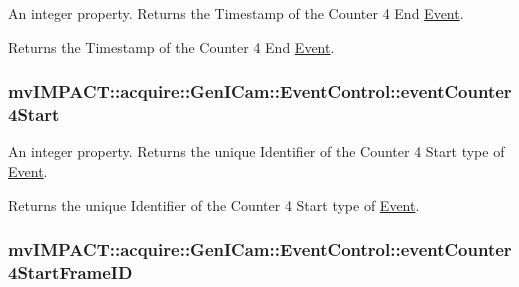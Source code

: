 An integer property. Returns the Timestamp of the Counter 4 End \hyperlink{classmv_i_m_p_a_c_t_1_1acquire_1_1_event}{Event}. 

Returns the Timestamp of the Counter 4 End \hyperlink{classmv_i_m_p_a_c_t_1_1acquire_1_1_event}{Event}. \hypertarget{classmv_i_m_p_a_c_t_1_1acquire_1_1_gen_i_cam_1_1_event_control_a86763dbf8a7b30e2cbb390cfa168662b}{
\subsubsection[{event\+Counter4\+Start}]{ mv\+I\+M\+P\+A\+C\+T\+::acquire\+::\+Gen\+I\+Cam\+::\+Event\+Control\+::event\+Counter4\+Start}}\label{classmv_i_m_p_a_c_t_1_1acquire_1_1_gen_i_cam_1_1_event_control_a86763dbf8a7b30e2cbb390cfa168662b}


An integer property. Returns the unique Identifier of the Counter 4 Start type of \hyperlink{classmv_i_m_p_a_c_t_1_1acquire_1_1_event}{Event}. 

Returns the unique Identifier of the Counter 4 Start type of \hyperlink{classmv_i_m_p_a_c_t_1_1acquire_1_1_event}{Event}. \hypertarget{classmv_i_m_p_a_c_t_1_1acquire_1_1_gen_i_cam_1_1_event_control_a1362ef1ce6721a6bd98e07d3fe6dfe37}{
\subsubsection[{event\+Counter4\+Start\+Frame\+I\+D}]{ mv\+I\+M\+P\+A\+C\+T\+::acquire\+::\+Gen\+I\+Cam\+::\+Event\+Control\+::event\+Counter4\+Start\+Frame\+I\+D}}\label{classmv_i_m_p_a_c_t_1_1acquire_1_1_gen_i_cam_1_1_event_control_a1362ef1ce6721a6bd98e07d3fe6dfe37}


